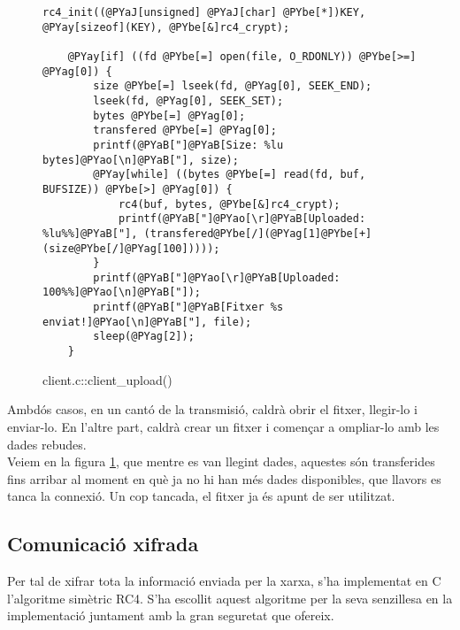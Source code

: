 \begin{figure}[htp]
\begin{Verbatim}[commandchars=@\[\]]
    rc4_init((@PYaJ[unsigned] @PYaJ[char] @PYbe[*])KEY, @PYay[sizeof](KEY), @PYbe[&]rc4_crypt);

    @PYay[if] ((fd @PYbe[=] open(file, O_RDONLY)) @PYbe[>=] @PYag[0]) {
        size @PYbe[=] lseek(fd, @PYag[0], SEEK_END);
        lseek(fd, @PYag[0], SEEK_SET);
        bytes @PYbe[=] @PYag[0];
        transfered @PYbe[=] @PYag[0];
        printf(@PYaB["]@PYaB[Size: %lu bytes]@PYao[\n]@PYaB["], size);
        @PYay[while] ((bytes @PYbe[=] read(fd, buf, BUFSIZE)) @PYbe[>] @PYag[0]) {
            rc4(buf, bytes, @PYbe[&]rc4_crypt);
            printf(@PYaB["]@PYao[\r]@PYaB[Uploaded: %lu%%]@PYaB["], (transfered@PYbe[/](@PYag[1]@PYbe[+](size@PYbe[/]@PYag[100]))));
        }
        printf(@PYaB["]@PYao[\r]@PYaB[Uploaded: 100%%]@PYao[\n]@PYaB["]);
        printf(@PYaB["]@PYaB[Fitxer %s enviat!]@PYao[\n]@PYaB["], file);
        sleep(@PYag[2]);
    }
\end{Verbatim}
    \caption{client.c::client\_upload()}
    \label{fig:client_client_upload}
\end{figure}

Ambdós casos, en un cantó de la transmisió, caldrà obrir el fitxer, llegir-lo i enviar-lo. En l'altre part,
caldrà crear un fitxer i començar a ompliar-lo amb les dades rebudes. \\

Veiem en la figura \ref{fig:client_client_upload}, que mentre es van llegint dades, aquestes són transferides fins arribar
al moment en què ja no hi han més dades disponibles, que llavors es tanca la connexió. Un cop tancada, el fitxer ja és apunt de ser utilitzat.

\subsection{Comunicació xifrada}

Per tal de xifrar tota la informació enviada per la xarxa, s'ha implementat en C l'algoritme simètric RC4.
S'ha escollit aquest algoritme per la seva senzillesa en la implementació juntament amb la gran seguretat
que ofereix.


